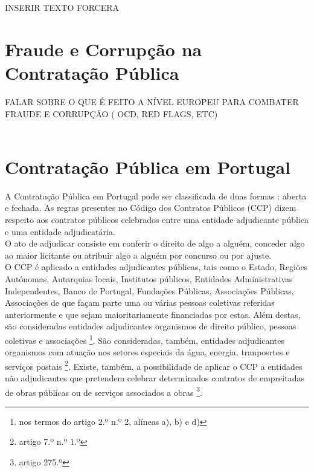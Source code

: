 INSERIR TEXTO FORCERA

\section{Fraude e Corrupção na Contratação Pública}

FALAR SOBRE O QUE É FEITO A NÍVEL EUROPEU PARA COMBATER FRAUDE E CORRUPÇÃO ( OCD, RED FLAGS, ETC)
\\
\\


\section{Contratação Pública em Portugal}


A Contratação Pública em Portugal pode ser classificada de duas formas : aberta e fechada. As regras presentes no Código dos Contratos Públicos (CCP) dizem respeito aos contratos públicos celebrados entre uma entidade adjudicante pública e uma entidade adjudicatária. \\




O ato de adjudicar consiste em conferir o direito de algo a alguém, conceder algo ao maior licitante ou atribuir algo a alguém por concurso ou por ajuste. \\

O CCP é aplicado a entidades adjudicantes públicas, tais como o Estado, Regiões Autónomas, Autarquias locais, Institutos públicos, Entidades Administrativas Independentes, Banco de Portugal, Fundações Públicas, Associações Públicas, Associações de que façam parte uma ou várias pessoas coletivas referidas anteriormente e que sejam maioritariamente financiadas por estas. Além destas, são consideradas entidades adjudicantes organismos de direito público, pessoas coletivas e associações \footnote{nos termos do artigo 2.º n.º 2, alíneas a), b) e d)}. São consideradas, também, entidades adjudicantes organismos com atuação nos setores especiais da água, energia, tranposrtes e serviços postais \footnote{artigo 7.º n.º 1.º}. Existe, também, a possibilidade de aplicar o CCP a entidades não adjudicantes que pretendem celebrar determinados contratos de empreitadas de obras públicas ou de serviços associados a obras \footnote{artigo 275.º}.


